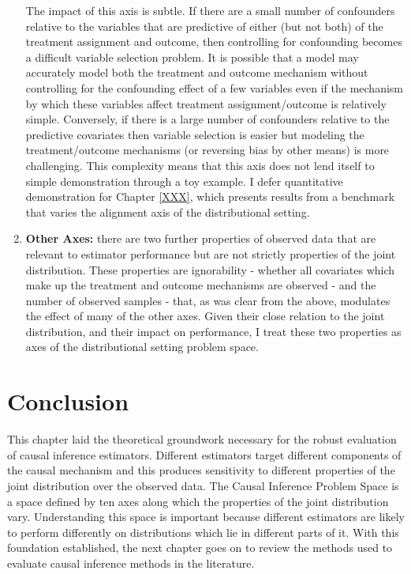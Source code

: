 \documentclass[../main.tex]{subfiles}
\begin{document}
\begin{enumerate}
\vspace{\baselineskip}

The impact of this axis is subtle. If there are a small number of confounders relative to the variables that are predictive of either (but not both) of the treatment assignment and outcome, then controlling for confounding becomes a difficult variable selection problem. It is possible that a model may accurately model both the treatment and outcome mechanism without controlling for the confounding effect of a few variables even if the mechanism by which these variables affect treatment assignment/outcome is relatively simple. Conversely, if there is a large number of confounders relative to the predictive covariates then variable selection is easier but modeling the treatment/outcome mechanisms (or reversing bias by other means) is more challenging. This complexity means that this axis does not lend itself to simple demonstration through a toy example. I defer quantitative demonstration for Chapter \ref{XXX}, which presents results from a benchmark that varies the alignment axis of the distributional setting.


\vspace{\baselineskip}
	\item \textbf{Other Axes:} there are two further properties of observed data that are relevant to estimator performance but are not strictly properties of the joint distribution. These properties are ignorability - whether all covariates which make up the treatment and outcome mechanisms are observed - and the number of observed samples - that, as was clear from the above, modulates the effect of many of the other axes. Given their close relation to the joint distribution, and their impact on performance, I treat these two properties as axes of the distributional setting problem space.\par

\end{enumerate}

\section{Conclusion}

This chapter laid the theoretical groundwork necessary for the robust evaluation of causal inference estimators. Different estimators target different components of the causal mechanism and this produces sensitivity to different properties of the joint distribution over the observed data. The Causal Inference Problem Space is a space defined by ten axes along which the properties of the joint distribution vary. Understanding this space is important because different estimators are likely to perform differently on distributions which lie in different parts of it. With this foundation established, the next chapter goes on to review the methods used to evaluate causal inference methods in the literature.
\end{document}
